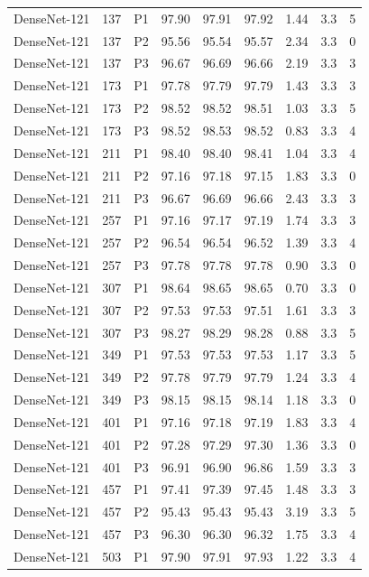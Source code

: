 {\begin{longtable}{lrlrrrrrr}
DenseNet-121 & 137 & P1 & 97.90 & 97.91 & 97.92 & 1.44 & 3.3 & 5 \\
DenseNet-121 & 137 & P2 & 95.56 & 95.54 & 95.57 & 2.34 & 3.3 & 0 \\
DenseNet-121 & 137 & P3 & 96.67 & 96.69 & 96.66 & 2.19 & 3.3 & 3 \\
DenseNet-121 & 173 & P1 & 97.78 & 97.79 & 97.79 & 1.43 & 3.3 & 3 \\
DenseNet-121 & 173 & P2 & 98.52 & 98.52 & 98.51 & 1.03 & 3.3 & 5 \\
DenseNet-121 & 173 & P3 & 98.52 & 98.53 & 98.52 & 0.83 & 3.3 & 4 \\
DenseNet-121 & 211 & P1 & 98.40 & 98.40 & 98.41 & 1.04 & 3.3 & 4 \\
DenseNet-121 & 211 & P2 & 97.16 & 97.18 & 97.15 & 1.83 & 3.3 & 0 \\
DenseNet-121 & 211 & P3 & 96.67 & 96.69 & 96.66 & 2.43 & 3.3 & 3 \\
DenseNet-121 & 257 & P1 & 97.16 & 97.17 & 97.19 & 1.74 & 3.3 & 3 \\
DenseNet-121 & 257 & P2 & 96.54 & 96.54 & 96.52 & 1.39 & 3.3 & 4 \\
DenseNet-121 & 257 & P3 & 97.78 & 97.78 & 97.78 & 0.90 & 3.3 & 0 \\
DenseNet-121 & 307 & P1 & 98.64 & 98.65 & 98.65 & 0.70 & 3.3 & 0 \\
DenseNet-121 & 307 & P2 & 97.53 & 97.53 & 97.51 & 1.61 & 3.3 & 3 \\
DenseNet-121 & 307 & P3 & 98.27 & 98.29 & 98.28 & 0.88 & 3.3 & 5 \\
DenseNet-121 & 349 & P1 & 97.53 & 97.53 & 97.53 & 1.17 & 3.3 & 5 \\
DenseNet-121 & 349 & P2 & 97.78 & 97.79 & 97.79 & 1.24 & 3.3 & 4 \\
DenseNet-121 & 349 & P3 & 98.15 & 98.15 & 98.14 & 1.18 & 3.3 & 0 \\
DenseNet-121 & 401 & P1 & 97.16 & 97.18 & 97.19 & 1.83 & 3.3 & 4 \\
DenseNet-121 & 401 & P2 & 97.28 & 97.29 & 97.30 & 1.36 & 3.3 & 0 \\
DenseNet-121 & 401 & P3 & 96.91 & 96.90 & 96.86 & 1.59 & 3.3 & 3 \\
DenseNet-121 & 457 & P1 & 97.41 & 97.39 & 97.45 & 1.48 & 3.3 & 3 \\
DenseNet-121 & 457 & P2 & 95.43 & 95.43 & 95.43 & 3.19 & 3.3 & 5 \\
DenseNet-121 & 457 & P3 & 96.30 & 96.30 & 96.32 & 1.75 & 3.3 & 4 \\
DenseNet-121 & 503 & P1 & 97.90 & 97.91 & 97.93 & 1.22 & 3.3 & 4 \\

\end{longtable}}
